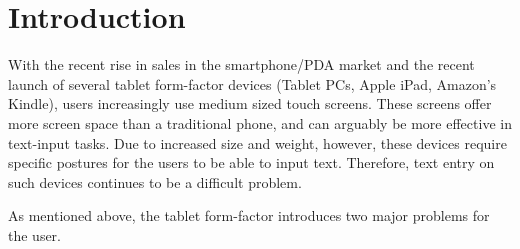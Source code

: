 \section{Introduction}

With the recent rise in sales in the smartphone/PDA market
and the recent launch of several tablet form-factor devices (Tablet PCs, Apple iPad, Amazon's Kindle), users increasingly use medium sized touch screens. These screens offer
more screen space than a traditional phone, and can arguably be more
effective in text-input tasks. Due to increased size and weight,
however, these devices require specific postures for the users to be
able to input text. Therefore, text entry on such devices continues to be a difficult problem.

As mentioned above, the tablet form-factor introduces two major problems for the user. 

